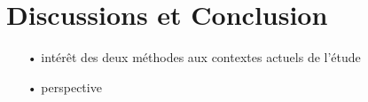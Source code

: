 \section{Discussions et Conclusion}

	\begin{itemize}
		\item[•] intérêt des deux méthodes aux contextes actuels de l'étude
		\item[•] perspective
	\end{itemize}